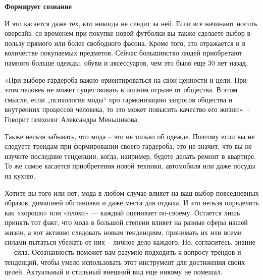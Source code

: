 \textbf{Формирует сознание}

И это касается даже тех, кто никогда не следит за ней. Если все начинают носить оверсайз, со временем при покупке новой футболки вы также сделаете выбор в пользу прямого или более свободного фасона. Кроме того, это отражается и в количестве покупаемых предметов. Сейчас большинство людей приобретают намного больше одежды, обуви и аксессуаров, чем это было еще 30 лет назад.

\begin{fancyquotes}
    «При выборе гардероба важно ориентироваться на свои ценности и цели. При этом человек не может существовать в полном отрыве от общества. В этом смысле, если „психология моды“ про гармонизацию запросов общества и внутренних процессов человека, то это может повысить качество его жизни». – Говорит психолог Александра Меньшикова.
\end{fancyquotes}

Также нельзя забывать, что мода – это не только об одежде. Поэтому если вы не следуете трендам при формировании своего гардероба, это не значит, что вы не изучите последние тенденции, когда, например, будете делать ремонт в квартире. То же самое касается приобретения новой техники, автомобиля или даже посуды на кухню.

Хотите вы того или нет, мода в любом случае влияет на ваш выбор повседневных образов, домашней обстановки и даже места для отдыха. И это нельзя определить как «хорошо» или «плохо» — каждый оценивает по-своему. Остается лишь принять тот факт, что мода в большой степени влияет на разные сферы нашей жизни, а вот активно следовать новым тенденциям, принимать их или всеми силами пытаться убежать от них – личное дело каждого. Но, согласитесь, знание — сила. Осознанность поможет вам разумно подходить к вопросу трендов и тенденций, чтобы умело использовать этот инструмент для достижения своих целей. Актуальный и стильный внешний вид еще никому не помешал.